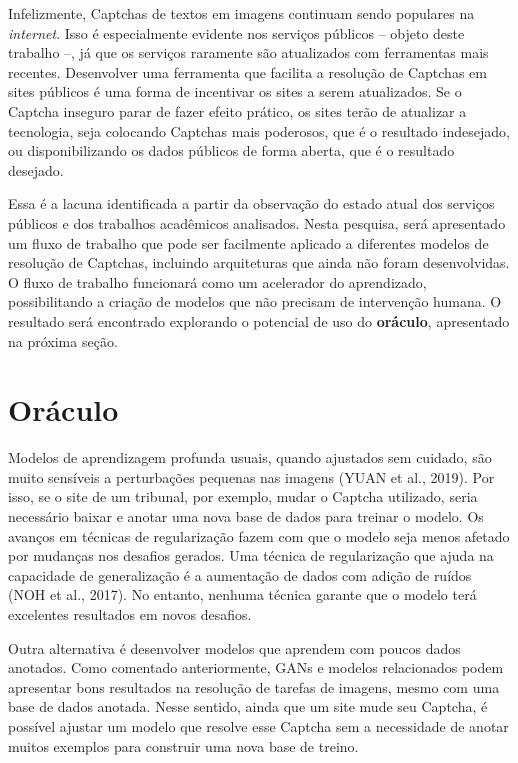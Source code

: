 \documentclass[12pt,twoside,brazilian]{book}
\begin{document}
Infelizmente, Captchas de textos em imagens continuam sendo populares na
\emph{internet}. Isso é especialmente evidente nos serviços públicos --
objeto deste trabalho --, já que os serviços raramente são atualizados
com ferramentas mais recentes. Desenvolver uma ferramenta que facilita a
resolução de Captchas em sites públicos é uma forma de incentivar os
sites a serem atualizados. Se o Captcha inseguro parar de fazer efeito
prático, os sites terão de atualizar a tecnologia, seja colocando
Captchas mais poderosos, que é o resultado indesejado, ou
disponibilizando os dados públicos de forma aberta, que é o resultado
desejado.

Essa é a lacuna identificada a partir da observação do estado atual dos
serviços públicos e dos trabalhos acadêmicos analisados. Nesta pesquisa,
será apresentado um fluxo de trabalho que pode ser facilmente aplicado a
diferentes modelos de resolução de Captchas, incluindo arquiteturas que
ainda não foram desenvolvidas. O fluxo de trabalho funcionará como um
acelerador do aprendizado, possibilitando a criação de modelos que não
precisam de intervenção humana. O resultado será encontrado explorando o
potencial de uso do \textbf{oráculo}, apresentado na próxima seção.

\hypertarget{oruxe1culo}{%
\section{Oráculo}\label{oruxe1culo}}

Modelos de aprendizagem profunda usuais, quando ajustados sem cuidado,
são muito sensíveis a perturbações pequenas nas imagens (YUAN et al.,
2019). Por isso, se o site de um tribunal, por exemplo, mudar o Captcha
utilizado, seria necessário baixar e anotar uma nova base de dados para
treinar o modelo. Os avanços em técnicas de regularização fazem com que
o modelo seja menos afetado por mudanças nos desafios gerados. Uma
técnica de regularização que ajuda na capacidade de generalização é a
aumentação de dados com adição de ruídos (NOH et al., 2017). No entanto,
nenhuma técnica garante que o modelo terá excelentes resultados em novos
desafios.

Outra alternativa é desenvolver modelos que aprendem com poucos dados
anotados. Como comentado anteriormente, GANs e modelos relacionados
podem apresentar bons resultados na resolução de tarefas de imagens,
mesmo com uma base de dados anotada. Nesse sentido, ainda que um site
mude seu Captcha, é possível ajustar um modelo que resolve esse Captcha
sem a necessidade de anotar muitos exemplos para construir uma nova base
de treino.
\end{document}
